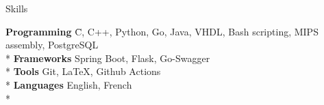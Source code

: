 \documentclass{article}
\newlength{\tabin}
\newlength{\secsep}
\newcommand{\lineunder}{\vspace*{-8pt} \\ \hspace*{-6pt} \hrulefill \\ \vspace*{-15pt}}
\newenvironment{tabbedsection}[1]{
  \begin{list}{}{
      \setlength{\itemsep}{0pt}
      \setlength{\labelsep}{0pt}
      \setlength{\labelwidth}{0pt}
      \setlength{\leftmargin}{\tabin}
      \setlength{\rightmargin}{\tabin}
      \setlength{\listparindent}{0pt}
      \setlength{\parsep}{0pt}
      \setlength{\parskip}{0pt}
      \setlength{\partopsep}{0pt}
      \setlength{\topsep}{#1}
    }
  \item[]
}{\end{list}}
\newenvironment{nospacetabbing}{
    \begin{tabbing}
}{\end{tabbing}\vspace{-1.2em}}
\newenvironment{resume_section}[1]{
  \filbreak
  \vspace{2\secsep}
  \textsc{\large#1}
  \lineunder
  \begin{tabbedsection}{\secsep}
}{\end{tabbedsection}}
\begin{document}
\begin{resume_section}{Skills}
  \begin{nospacetabbing}

  \textbf{Programming}  \= C, C++, Python, Go, Java, VHDL, Bash scripting, MIPS assembly, PostgreSQL\\*
  \textbf{Frameworks} \> Spring Boot, Flask, Go-Swagger\\*
  \textbf{Tools} \> Git, \LaTeX, Github Actions \\*
  \textbf{Languages} \> English, French\\*
  \end{nospacetabbing}
\end{resume_section}
\end{document}
